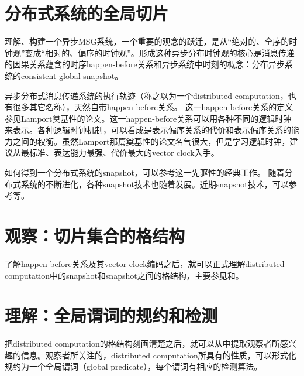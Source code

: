 \documentclass[UTF8]{ctexrep}
\begin{document}
\section{分布式系统的全局切片}

理解、构建一个异步MSG系统，一个重要的观念的跃迁，是从“绝对的、全序的时钟观”变成“相对的、偏序的时钟观”。形成这种异步分布时钟观的核心是消息传递的因果关系蕴含的时序happen-before关系和异步系统中时刻的概念：分布异步系统的consistent global snapshot。

异步分布式消息传递系统的执行轨迹（称之以为一个distributed computation，也有很多其它名称），天然自带happen-before关系。
这一happen-before关系的定义参见Lamport奠基性的论文\cite{Lamport78}。这一happen-before关系可以用各种不同的逻辑时钟来表示。各种逻辑时钟机制，可以看成是表示偏序关系的代价和表示偏序关系的能力之间的权衡。虽然Lamport那篇奠基性的论文名气很大，但是学习逻辑时钟，建议从最标准、表达能力最强、代价最大的vector clock入手\cite{Mattern89}。


如何得到一个分布式系统的snapshot，可以参考\cite{Chandy85}这一先驱性的经典工作。
随着分布式系统的不断进化，各种snapshot技术也随着发展。近期snapshot技术，可以参考\cite{Yu24}等。

\section{观察：切片集合的格结构}


了解happen-before关系及其vector clock编码之后，就可以正式理解distributed computation中的snapshot和snapshot之间的格结构，主要参见\cite{Mattern89}和\cite{Babaoglu93}。

\section{理解：全局谓词的规约和检测}

把distributed computation的格结构刻画清楚之后，就可以从中提取观察者所感兴趣的信息。观察者所关注的，distributed computation所具有的性质，可以形式化规约为一个全局谓词（global predicate），每个谓词有相应的检测算法。
\end{document}

